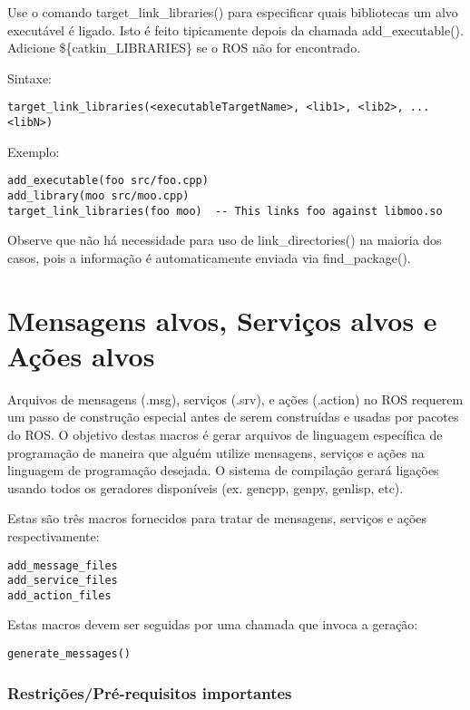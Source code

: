 Use o comando target\_link\_libraries() para especificar quais bibliotecas um alvo executável é ligado. Isto é feito tipicamente depois da chamada add\_executable(). Adicione \$\{catkin\_LIBRARIES\} se o ROS não for encontrado.

Sintaxe:

\begin{verbatim}
target_link_libraries(<executableTargetName>, <lib1>, <lib2>, ... <libN>)
\end{verbatim}

Exemplo:

\begin{verbatim}
add_executable(foo src/foo.cpp)
add_library(moo src/moo.cpp)
target_link_libraries(foo moo)  -- This links foo against libmoo.so
\end{verbatim}

Observe que não há necessidade para uso de link\_directories() na maioria dos casos, pois a informação é automaticamente enviada via find\_package().

\section{Mensagens alvos, Serviços alvos e Ações alvos}

Arquivos de mensagens (.msg), serviços (.srv), e ações (.action) no ROS requerem um passo de construção especial antes de serem construídas e usadas por pacotes do ROS. O objetivo destas macros é gerar arquivos de linguagem específica de programação de maneira que alguém utilize mensagens, serviços e ações na linguagem de programação desejada. O sistema de compilação gerará ligações usando todos os geradores disponíveis (ex. gencpp, genpy, genlisp, etc).

Estas são três macros fornecidos para tratar de mensagens, serviços e ações respectivamente:

\begin{verbatim}
add_message_files
add_service_files
add_action_files
\end{verbatim}

Estas macros devem ser seguidas por uma chamada que invoca a geração:

\begin{verbatim}
generate_messages()
\end{verbatim}

\subsubsection{Restrições/Pré-requisitos importantes}

